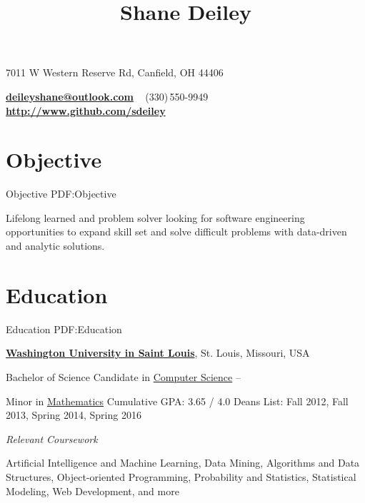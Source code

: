 \documentclass[a4paper,10pt,oneside]{article}
\begin{document}
\tracingall

\title{Shane Deiley}

\begin{subtitle}
7011 W Western Reserve Rd, Canfield, OH 44406
\par
\href{mailto:deileyshane@outlook.com}
{\textbf{deileyshane@outlook.com}}
\,\BulletSymbol\,
\,(330)\,550-9949
\,\BulletSymbol\,
\href{http://www.github.com/sdeiley}
{\textbf{http://www.github.com/sdeiley}}
\end{subtitle}

\begin{body}



\section{Objective}
{Objective}
{PDF:Objective}

Lifelong learned and problem solver looking for software engineering opportunities to expand skill set and solve difficult problems with data-driven and analytic solutions.


\section{Education}
{Education}
{PDF:Education}

\href{http://engineering.wustl.edu/Pages/home.aspx}
{\textbf{Washington University in Saint Louis}},
St. Louis, Missouri, USA
\par
Bachelor of Science Candidate in 
\href{http://cse.wustl.edu/Pages/default.aspx}
{Computer Science}
\hfill
{} --
\begin{detail}
Minor in \href{http://wumath.wustl.edu}{Mathematics}
\BulletItem
Cumulative GPA: 3.65 / 4.0
\BulletItem
Deans List: Fall 2012, Fall 2013, Spring 2014, Spring 2016
\end{detail}

\EntryGap
\textit{Relevant Coursework}
\par
Artificial Intelligence and Machine Learning, Data Mining, Algorithms and Data Structures, Object-oriented Programming, Probability and Statistics, Statistical Modeling, Web Development, and more


\end{body}
\end{document}
